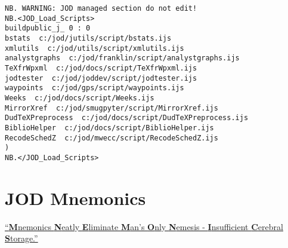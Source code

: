 \begin{lstlisting}[frame=single,framerule=0pt,basicstyle=\ttfamily\footnotesize]   
NB. WARNING: JOD managed section do not edit!
NB.<JOD_Load_Scripts>
buildpublic_j_ 0 : 0
bstats  c:/jod/jutils/script/bstats.ijs
xmlutils  c:/jod/utils/script/xmlutils.ijs
analystgraphs  c:/jod/franklin/script/analystgraphs.ijs
TeXfrWpxml  c:/jod/docs/script/TeXfrWpxml.ijs
jodtester  c:/jod/joddev/script/jodtester.ijs
waypoints  c:/jod/gps/script/waypoints.ijs
Weeks  c:/jod/docs/script/Weeks.ijs
MirrorXref  c:/jod/smugpyter/script/MirrorXref.ijs
DudTeXPreprocess  c:/jod/docs/script/DudTeXPreprocess.ijs
BiblioHelper  c:/jod/docs/script/BiblioHelper.ijs
RecodeSchedZ  c:/jod/mwecc/script/RecodeSchedZ.ijs
)
NB.</JOD_Load_Scripts>
\end{lstlisting}

\newpage


\newpage

  
\newpage


\newpage
\section{JOD Mnemonics}

\large
\itshape
  
\href{https://www.acronymfinder.com/Mnemonics-Neatly-Eliminate-Man's-Only-Nemesis-_-Insufficient-Cerebral-Storage-(MNEMONICS).html}{``\textbf{M}nemonics \textbf{N}eatly \textbf{E}liminate \textbf{M}an's \textbf{O}nly \textbf{N}emesis - \textbf{I}nsufficient \textbf{C}erebral \textbf{S}torage.''}

\Large


